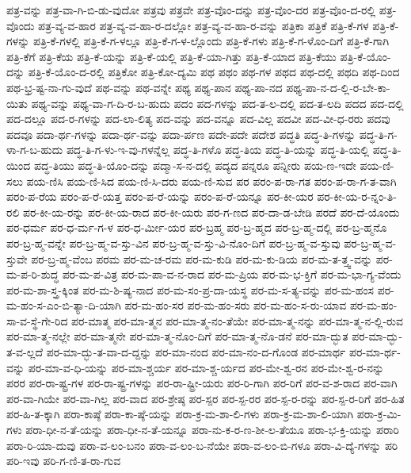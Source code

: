 {ಪತ್ರ-ವನ್ನು
ಪತ್ರ-ವಾ-ಗಿ-ಬಿ-ಡು-ವುದೋ
ಪತ್ರವು
ಪತ್ರವೇ
ಪತ್ರ-ವೊಂ-ದನ್ನು
ಪತ್ರ-ವೊಂ-ದರ
ಪತ್ರ-ವೊಂ-ದ-ರಲ್ಲಿ
ಪತ್ರ-ವೊಂದು
ಪತ್ರ-ವ್ಯ-ವ-ಹಾರ
ಪತ್ರ-ವ್ಯ-ವ-ಹಾ-ರ-ದಲ್ಲೋ
ಪತ್ರ-ವ್ಯ-ವ-ಹಾ-ರ-ವನ್ನು
ಪತ್ರಿಕಾ
ಪತ್ರಿಕೆ
ಪತ್ರಿ-ಕೆ-ಗಳ
ಪತ್ರಿ-ಕೆ-ಗಳನ್ನು
ಪತ್ರಿ-ಕೆ-ಗಳಲ್ಲಿ
ಪತ್ರಿ-ಕೆ-ಗ-ಳಲ್ಲೂ
ಪತ್ರಿ-ಕೆ-ಗ-ಳ-ಲ್ಲೊಂದು
ಪತ್ರಿ-ಕೆ-ಗಳು
ಪತ್ರಿ-ಕೆ-ಗ-ಳೊಂ-ದಿಗೆ
ಪತ್ರಿ-ಕೆ-ಗಾಗಿ
ಪತ್ರಿ-ಕೆಗೆ
ಪತ್ರಿ-ಕೆಯ
ಪತ್ರಿ-ಕೆ-ಯನ್ನು
ಪತ್ರಿ-ಕೆ-ಯಲ್ಲಿ
ಪತ್ರಿ-ಕೆ-ಯಾ-ಗಿತ್ತು
ಪತ್ರಿ-ಕೆ-ಯಾದ
ಪತ್ರಿ-ಕೆಯು
ಪತ್ರಿ-ಕೆ-ಯೊಂ-ದನ್ನು
ಪತ್ರಿ-ಕೆ-ಯೊಂ-ದ-ರಲ್ಲಿ
ಪತ್ರಿಕೋ
ಪತ್ರಿ-ಕೋ-ದ್ಯಮಿ
ಪಥ
ಪಥಂ
ಪಥ-ಗಳ
ಪಥದ
ಪಥ-ದಲ್ಲಿ
ಪಥದಿ
ಪಥ-ದಿಂದ
ಪಥ-ಭ್ರ-ಷ್ಟ-ನಾ-ಗು-ವುದೆ
ಪಥ-ವನ್ನು
ಪಥ-ವನ್ನೇ
ಪಥ್ಯ
ಪಥ್ಯ-ಪಾನ
ಪಥ್ಯ-ಪಾ-ನದ
ಪಥ್ಯ-ಪಾ-ನ-ದ-ಲ್ಲಿ-ರ-ಬೇ-ಕಾ-ಯಿತು
ಪಥ್ಯ-ವನ್ನು
ಪಥ್ಯ-ವಾ-ಗ-ದಿ-ರ-ಬ-ಹುದು
ಪದಂ
ಪದ-ಗಳನ್ನು
ಪದ-ತ-ಲ-ದಲ್ಲಿ
ಪದ-ತ-ಲದಿ
ಪದದ
ಪದ-ದಲ್ಲಿ
ಪದ-ದಲ್ಲೂ
ಪದ-ರ-ಗಳನ್ನು
ಪದ-ಲಾ-ಲಿತ್ಯ
ಪದ-ವನ್ನು
ಪದ-ವನ್ನೂ
ಪದ-ವಿಲ್ಲ
ಪದವೀ
ಪದ-ವೀ-ಧ-ರರು
ಪದವು
ಪದವೂ
ಪದಾ-ರ್ಥ-ಗಳನ್ನು
ಪದಾ-ರ್ಥ-ವನ್ನು
ಪದಾ-ರ್ಪಣ
ಪದೇ-ಪದೇ
ಪದೇಶ
ಪದ್ಧತಿ
ಪದ್ಧ-ತಿ-ಗಳನ್ನು
ಪದ್ಧ-ತಿ-ಗ-ಳಾ-ಗ-ಬ-ಹುದು
ಪದ್ಧ-ತಿ-ಗ-ಳು-ಇ-ವು-ಗಳನ್ನೆಲ್ಲ
ಪದ್ಧ-ತಿ-ಗಳೊ
ಪದ್ಧ-ತಿಯ
ಪದ್ಧ-ತಿ-ಯನ್ನು
ಪದ್ಧ-ತಿ-ಯಲ್ಲಿ
ಪದ್ಧ-ತಿ-ಯಿಂದ
ಪದ್ಧ-ತಿಯು
ಪದ್ಧ-ತಿ-ಯೊಂ-ದನ್ನು
ಪದ್ಮಾ-ಸ-ನ-ದಲ್ಲಿ
ಪದ್ಯದ
ಪನ್ನರೂ
ಪನ್ನೀರು
ಪಯ-ಣ-ಇದೇ
ಪಯ-ಣಿ-ಸಲು
ಪಯ-ಣಿಸಿ
ಪಯ-ಣಿ-ಸಿದ
ಪಯ-ಣಿ-ಸಿ-ದರು
ಪಯ-ಣಿ-ಸುವ
ಪರ
ಪರಂ-ಪ-ರಾ-ಗತ
ಪರಂ-ಪ-ರಾ-ಗ-ತ-ವಾಗಿ
ಪರಂ-ಪ-ರೆಯ
ಪರಂ-ಪ-ರೆ-ಯತ್ತ
ಪರಂ-ಪ-ರೆ-ಯನ್ನು
ಪರಂ-ಪ-ರೆ-ಯನ್ನೂ
ಪರ-ಕೀ-ಯರ
ಪರ-ಕೀ-ಯ-ರ-ನ್ನಂ-ತಿ-ರಲಿ
ಪರ-ಕೀ-ಯ-ರನ್ನು
ಪರ-ಕೀ-ಯ-ರಾದ
ಪರ-ಕೀ-ಯರು
ಪರ-ಗ-ಣದ
ಪರ-ದಾ-ಡ-ಬೇಡಿ
ಪರದೆ
ಪರ-ದೆ-ಯೊಂದು
ಪರ-ಧರ್ಮ
ಪರ-ಧ-ರ್ಮ-ಗ-ಳ
ಪರ-ಧ-ರ್ಮೀ-ಯರ
ಪರ-ಬ್ರಹ್ಮ
ಪರ-ಬ್ರ-ಹ್ಮದ
ಪರ-ಬ್ರ-ಹ್ಮ-ದಲ್ಲಿ
ಪರ-ಬ್ರ-ಹ್ಮನೊ
ಪರ-ಬ್ರ-ಹ್ಮ-ವನ್ನೇ
ಪರ-ಬ್ರ-ಹ್ಮ-ವ-ಸ್ತು-ವಿನ
ಪರ-ಬ್ರ-ಹ್ಮ-ವ-ಸ್ತು-ವಿ-ನೊಂ-ದಿಗೆ
ಪರ-ಬ್ರ-ಹ್ಮ-ವ-ಸ್ತುವು
ಪರ-ಬ್ರ-ಹ್ಮ-ವ-ಸ್ತುವೇ
ಪರ-ಬ್ರ-ಹ್ಮ-ವೆಂಬ
ಪರಮ
ಪರ-ಮ-ಚ-ರಮ
ಪರ-ಮ-ಕುಡಿ
ಪರ-ಮ-ಕು-ಡಿಯ
ಪರ-ಮ-ತ-ತ್ತ್ವ-ವನ್ನು
ಪರ-ಮ-ಪ-ರಿ-ಶುದ್ಧ
ಪರ-ಮ-ಪ-ವಿತ್ರ
ಪರ-ಮ-ಪಾ-ವ-ನ-ರಾದ
ಪರ-ಮ-ಪ್ರಿಯ
ಪರ-ಮ-ಭ-ಕ್ತಿಗೆ
ಪರ-ಮ-ಭಾ-ಗ್ಯ-ವೆಂದು
ಪರ-ಮ-ಶಾ-ಸ್ತ್ರ-ಕ್ಕಿಂತ
ಪರ-ಮ-ಶಿ-ಷ್ಯ-ನಾದ
ಪರ-ಮ-ಸಂ-ಪ್ರ-ದಾ-ಯಸ್ಥ
ಪರ-ಮ-ಸ-ತ್ಯ-ವನ್ನು
ಪರ-ಮ-ಹಂಸ
ಪರ-ಮ-ಹಂ-ಸ-ಎಂ-ಬಿ-ತ್ಯಾ-ದಿ-ಯಾಗಿ
ಪರ-ಮ-ಹಂ-ಸರ
ಪರ-ಮ-ಹಂ-ಸರು
ಪರ-ಮ-ಹಂ-ಸ-ರು-ಯಾವ
ಪರ-ಮ-ಹಂ-ಸಾ-ವ-ಸ್ಥೆ-ಗೇ-ರಿದ
ಪರ-ಮಾತ್ಮ
ಪರ-ಮಾ-ತ್ಮನ
ಪರ-ಮಾ-ತ್ಮ-ನಂ-ತೆಯೇ
ಪರ-ಮಾ-ತ್ಮ-ನನ್ನು
ಪರ-ಮಾ-ತ್ಮ-ನ-ಲ್ಲಿ-ರುವ
ಪರ-ಮಾ-ತ್ಮ-ನಲ್ಲೇ
ಪರ-ಮಾ-ತ್ಮನೇ
ಪರ-ಮಾ-ತ್ಮ-ನೊಂ-ದಿಗೆ
ಪರ-ಮಾ-ತ್ಮ-ನೊ-ಡನೆ
ಪರ-ಮಾ-ದ್ಭುತ
ಪರ-ಮಾ-ದ್ಭು-ತ-ವ-ಲ್ಲದೆ
ಪರ-ಮಾ-ದ್ಭು-ತ-ವಾ-ದ-ದ್ದನ್ನು
ಪರ-ಮಾ-ನಂದ
ಪರ-ಮಾ-ನಂ-ದ-ಗೊಂಡ
ಪರ-ಮಾರ್ಥ
ಪರ-ಮಾ-ರ್ಥ-ವನ್ನು
ಪರ-ಮಾ-ವ-ಧಿ-ಯನ್ನು
ಪರ-ಮಾ-ಶ್ಚರ್ಯ
ಪರ-ಮಾ-ಶ್ಚ-ರ್ಯದ
ಪರ-ಮೇ-ಶ್ವ-ರನ
ಪರ-ಮೇ-ಶ್ವ-ರ-ನನ್ನು
ಪರರ
ಪರ-ರಾ-ಷ್ಟ್ರ-ಗಳ
ಪರ-ರಾ-ಷ್ಟ್ರ-ಗಳನ್ನು
ಪರ-ರಾ-ಷ್ಟ್ರೀ-ಯರು
ಪರ-ರಿ-ಗಾಗಿ
ಪರ-ರಿಗೆ
ಪರ-ವ-ಶ-ರಾದ
ಪರ-ವಾಗಿ
ಪರ-ವಾ-ಗಿಯೇ
ಪರ-ವಾ-ಗಿಲ್ಲ
ಪರ-ವಾದ
ಪರ-ಶ್ರೇಷ್ಠ
ಪರ-ಸ್ಪರ
ಪರ-ಸ್ಪ-ರರ
ಪರ-ಸ್ಪ-ರ-ರನ್ನು
ಪರ-ಸ್ಪ-ರ-ರಿಗೆ
ಪರ-ಹಿತ
ಪರ-ಹಿ-ತ-ಕ್ಕಾಗಿ
ಪರಾ-ಕಾಷ್ಠೆ
ಪರಾ-ಕಾ-ಷ್ಠೆ-ಯನ್ನು
ಪರಾ-ಕ್ರ-ಮ-ಶಾ-ಲಿ-ಗಳು
ಪರಾ-ಕ್ರ-ಮ-ಶಾ-ಲಿ-ಯಾಗಿ
ಪರಾ-ಕ್ರ-ಮಿ-ಗಳು
ಪರಾ-ಧೀ-ನ-ತೆ-ಯನ್ನು
ಪರಾ-ಧೀ-ನ-ತೆ-ಯನ್ನೂ
ಪರಾ-ನು-ಕ-ರ-ಣ-ಶೀ-ಲ-ತೆಯೂ
ಪರಾ-ಭ-ಕ್ತಿ-ಯನ್ನು
ಪರಾರಿ
ಪರಾ-ರಿ-ಯಾ-ದುವು
ಪರಾ-ವ-ಲಂ-ಬನಂ
ಪರಾ-ವ-ಲಂ-ಬ-ನೆಯೇ
ಪರಾ-ವ-ಲಂ-ಬಿ-ಗಳೂ
ಪರಾ-ವಿ-ದ್ಯೆ-ಗಳನ್ನು
ಪರಿ
ಪರಿ-ಇವು
ಪರಿ-ಗ-ಣಿ-ತ-ರಾ-ಗುವ
}
